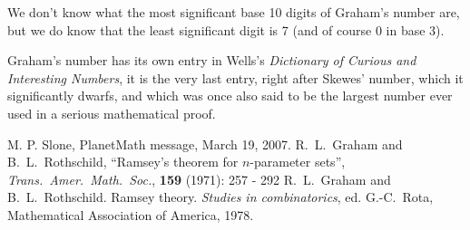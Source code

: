 \documentclass[12pt]{article}
\begin{document}
We don't know what the most significant base 10 digits of Graham's number are, but we do know that the least significant digit is 7 (and of course 0 in base 3).

Graham's number has its own entry in Wells's {\it Dictionary of Curious and Interesting Numbers}, it is the very last entry, right after Skewes' number, which it significantly dwarfs, and which was once also said to be the largest number ever used in a serious mathematical proof.  

\begin{thebibliography}{2}
 M. P. Slone, PlanetMath message, March 19, 2007.
 R.~L.~Graham and B.~L.~Rothschild, ``Ramsey's theorem for $n$-parameter sets'', {\it Trans.~Amer.~Math.~Soc.}, {\bf 159} (1971): 257 - 292
 R.~L.~Graham and B.~L.~Rothschild. Ramsey theory. {\it Studies in combinatorics}, ed. G.-C.~Rota, Mathematical Association of America, 1978.
\end{thebibliography}
\end{document}
